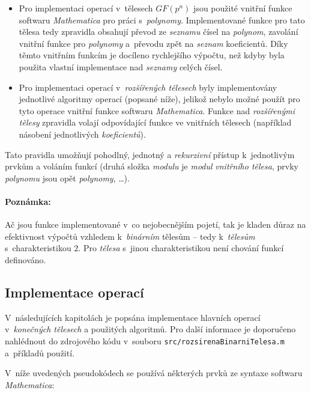 \documentclass[thesis=M,czech,hidelinks]{FITthesis}[2012/06/26]
\newcommand{\0}{{\textcolor[gray]{0.75}{0}}}
\begin{document}
\begin{itemize}
    \item Pro implementaci operací v~tělesech $GF(p^n)$ jsou použité vnitřní
        funkce softwaru \emph{Mathematica} pro práci s~\emph{polynomy}.
        Implementované funkce pro tato tělesa tedy zpravidla obsahují převod ze
        \emph{seznamu} čísel na \emph{polynom}, zavolání vnitřní funkce pro
        \emph{polynomy} a~převodu zpět na \emph{seznam} koeficientů. Díky těmto
        vnitřním funkcím je docíleno rychlejšího výpočtu, než kdyby byla použita
        vlastní implementace nad \emph{seznamy} celých čísel.

    \item Pro implementaci operací v~\emph{rozšířených tělesech} byly
        implementovány jednotlivé algoritmy operací (popsané níže), jelikož
        nebylo možné použít pro tyto operace vnitřní funkce softwaru
        \emph{Mathematica}. Funkce nad \emph{rozšířenými tělesy} zpravidla
        volají odpovídající funkce ve vnitřních tělesech (například násobení
        jednotlivých \emph{koeficientů}).

\end{itemize}

Tato pravidla umožňují pohodlný, jednotný a \emph{rekurzivní} přístup
k~jednotlivým prvkům a voláním funkcí (druhá složka \emph{modulu} je
\emph{modul} \emph{vnitřního tělesa}, prvky \emph{polynomu} jsou opět
\emph{polynomy}, \ldots).


\paragraph{Poznámka:} Ač jsou funkce implementované v~co nejobecnějším pojetí,
tak je kladen důraz na efektivnost výpočtů vzhledem k~\emph{binárním} tělesům --
tedy k~\emph{tělesům} s~charakteristikou $2$. Pro \emph{tělesa} s~jinou
charakteristikou není chování funkcí definováno.


\subsection{Implementace operací}\label{kap_implementace_operaci}

V~následujících kapitolách je popsána implementace hlavních operací
v~\emph{konečných tělesech} a použitých algoritmů. Pro další informace je
doporučeno nahlédnout do zdrojového kódu v~souboru
\texttt{src/rozsirenaBinarniTelesa.m} a~příkladů použití.

V~níže uvedených pseudokódech se používá některých prvků ze syntaxe softwaru
\emph{Mathematica}:
\end{document}
